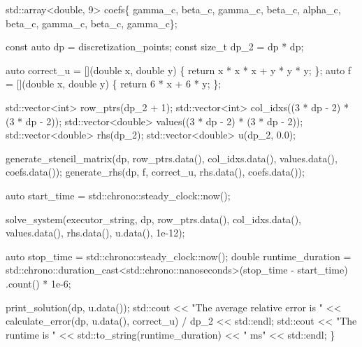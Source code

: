 {\begin{DoxyCodeInclude}
    std::array<double, 9> coefs\{
        gamma\_c, beta\_c, gamma\_c,
    beta\_c, alpha\_c, beta\_c,
        gamma\_c, beta\_c, gamma\_c\};

    \textcolor{keyword}{const} \textcolor{keyword}{auto} dp = discretization\_points;
    \textcolor{keyword}{const} \textcolor{keywordtype}{size\_t} dp\_2 = dp * dp;

    \textcolor{keyword}{auto} correct\_u = [](\textcolor{keywordtype}{double} x, \textcolor{keywordtype}{double} y) \{ \textcolor{keywordflow}{return} x * x * x + y * y * y; \};
    \textcolor{keyword}{auto} f = [](\textcolor{keywordtype}{double} x, \textcolor{keywordtype}{double} y) \{ \textcolor{keywordflow}{return} 6 * x + 6 * y; \};

    std::vector<int> row\_ptrs(dp\_2 + 1);
    std::vector<int> col\_idxs((3 * dp - 2) * (3 * dp - 2));
    std::vector<double> values((3 * dp - 2) * (3 * dp - 2));
    std::vector<double> rhs(dp\_2);
    std::vector<double> u(dp\_2, 0.0);

    generate\_stencil\_matrix(dp, row\_ptrs.data(), col\_idxs.data(), values.data(),
                            coefs.data());
    generate\_rhs(dp, f, correct\_u, rhs.data(), coefs.data());

    \textcolor{keyword}{auto} start\_time = std::chrono::steady\_clock::now();

    solve\_system(executor\_string, dp, row\_ptrs.data(), col\_idxs.data(),
                 values.data(), rhs.data(), u.data(), 1e-12);

    \textcolor{keyword}{auto} stop\_time = std::chrono::steady\_clock::now();
    \textcolor{keywordtype}{double} runtime\_duration =
        std::chrono::duration\_cast<std::chrono::nanoseconds>(stop\_time -
                                                             start\_time)
            .count() *
        1e-6;

    print\_solution(dp, u.data());
    std::cout << \textcolor{stringliteral}{"The average relative error is "}
              << calculate\_error(dp, u.data(), correct\_u) / dp\_2 << std::endl;
    std::cout << \textcolor{stringliteral}{"The runtime is "} << std::to\_string(runtime\_duration) << \textcolor{stringliteral}{" ms"}
              << std::endl;
\}
\end{DoxyCodeInclude}
 }